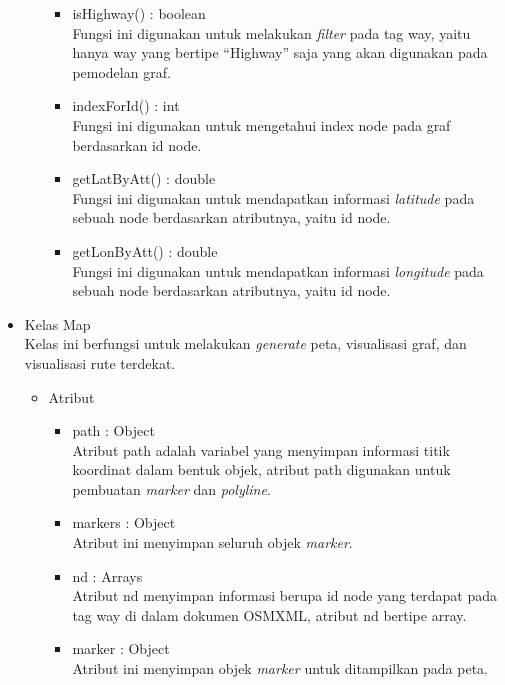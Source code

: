\begin{itemize}
\begin{itemize}
\begin{itemize}
      \item isHighway() : boolean\\
      Fungsi ini digunakan untuk melakukan \textit{filter} pada tag way, yaitu
      hanya way yang bertipe ``Highway'' saja yang akan digunakan pada pemodelan
      graf.
      
      \item indexForId() : int\\
      Fungsi ini digunakan untuk mengetahui index node pada graf berdasarkan id
      node.
      
      \item getLatByAtt() : double\\
      Fungsi ini digunakan untuk mendapatkan informasi \textit{latitude} pada
      sebuah node berdasarkan atributnya, yaitu id node.
      
      \item getLonByAtt() : double\\
      Fungsi ini digunakan untuk mendapatkan informasi \textit{longitude} pada
      sebuah node berdasarkan atributnya, yaitu id node.
    \end{itemize}
  \end{itemize}
  
  \item Kelas Map\\
  Kelas ini berfungsi untuk melakukan \textit{generate} peta, visualisasi graf,
  dan visualisasi rute terdekat.
  \begin{itemize}
    \item Atribut
    \begin{itemize}
      \item path : Object\\
      Atribut path adalah variabel yang menyimpan informasi titik koordinat
      dalam bentuk objek, atribut path digunakan untuk pembuatan \textit{marker}
      dan \textit{polyline}.
      
      \item markers : Object\\
      Atribut ini menyimpan seluruh objek \textit{marker}.
      
      \item nd : Arrays\\
      Atribut nd menyimpan informasi berupa id node yang terdapat pada tag way
      di dalam dokumen OSMXML, atribut nd bertipe array.
      
      \item marker : Object\\
      Atribut ini menyimpan objek \textit{marker} untuk ditampilkan pada peta.
      

\end{itemize}
\end{itemize}
\end{itemize}
